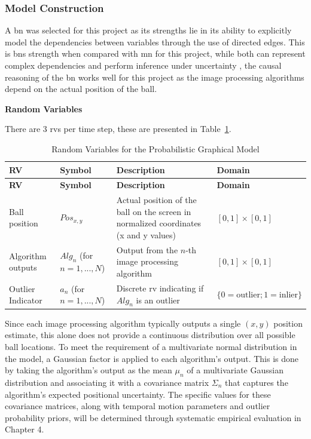 \documentclass[12pt,a4paper]{article}
\begin{document}
\subsubsection{Model Construction}
A \acs{bn} was selected for this project as its strengths lie in its ability to explicitly model the dependencies between variables through the use of directed edges. This is \acs{bn}s strength when compared with \acs{mn} for this project, while both can represent complex dependencies and perform inference under uncertainty \parencite{koller2009pgm}, the causal reasoning of the \acs{bn} works well for this project as the image processing algorithms depend on the actual position of the ball.

\textbf{Random Variables}

There are 3 \acs{rv}s per time step, these are presented in Table~\ref{tab:rvs}. 

\begin{longtable}{p{} p{} p{} p{}}
\caption{Random Variables for the Probabilistic Graphical Model} \label{tab:rvs} \\
\hline
\textbf{RV} & \textbf{Symbol} & \textbf{Description} & \textbf{Domain} \\
\hline
\endfirsthead
\hline
\textbf{RV} & \textbf{Symbol} & \textbf{Description} & \textbf{Domain} \\
\hline
\endhead
\hline
\endfoot
\hline
\endlastfoot
		Ball position & $Pos_{x,y}$ & Actual position of the ball on the screen in normalized coordinates (x and y values) & $[0, 1] \times [0, 1]$ \\
		Algorithm outputs & $Alg_n$ (for $n=1,...,N$) & Output from the $n$-th image processing algorithm & $[0, 1] \times [0, 1]$ \\
		Outlier Indicator & $a_n$ (for $n=1,...,N$) & Discrete \acs{rv} indicating if $Alg_n$ is an outlier & $\{0 = \text{outlier}; 1 = \text{inlier}\}$ \\
\end{longtable}

Since each image processing algorithm typically outputs a single $(x, y)$ position estimate, this alone does not provide a continuous distribution over all possible ball locations. To meet the requirement of a multivariate normal distribution in the model, a Gaussian factor is applied to each algorithm’s output. This is done by taking the algorithm's output as the mean $\mu_n$ of a multivariate Gaussian distribution and associating it with a covariance matrix $\Sigma_n$ that captures the algorithm's expected positional uncertainty. The specific values for these covariance matrices, along with temporal motion parameters and outlier probability priors, will be determined through systematic empirical evaluation in Chapter 4.
\end{document}
